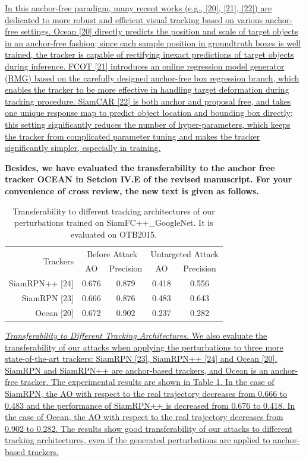 \documentclass[12pt]{article}
\begin{document}
\uline{In this anchor-free paradigm, many recent works (e.g., [20], [21], [22]) are dedicated to more robust and efficient visual tracking based on various anchor-free settings.
Ocean [20] directly predicts the position and scale of target objects in an anchor-free fashion; since each sample position in groundtruth boxes is well trained, the tracker is capable of rectifying inexact predictions of target objects during inference.
FCOT [21] introduces an online regression model generator (RMG) based on the carefully designed anchor-free box regression branch, which enables the tracker to be more effective in handling target deformation during tracking procedure.
SiamCAR [22] is both anchor and proposal free, and takes one unique response map to predict object location and bounding box directly; this setting significantly reduces the number of hyper-parameters, which keeps the tracker from complicated parameter tuning and makes the tracker significantly simpler, especially in training.
}

\textbf{Besides, we have evaluated the transferability to the anchor free tracker OCEAN in Setcion IV.E of the revised manuscript. For your convenience of cross review, the new text is given as follows.}

\begin{table}[t]
  \renewcommand\thetable{XIII}
  \centering
  \caption{Transferability to different tracking architectures of our perturbations trained on SiamFC++\_GoogleNet. It is evaluated on OTB2015.}
  \begin{tabular}{rcccc} 
  \toprule
  \multirow{2}{*}[-2pt]{Trackers} & \multicolumn{2}{c}{Before Attack} & \multicolumn{2}{c}{Untargeted Attack}  \\
  \cmidrule{2-5}
                            & AO & Precision              & AO    & Precision \\ \midrule
  SiamRPN++ [24]            & 0.676   & 0.879             & 0.418 & 0.556     \\
  SiamRPN [23]              & 0.666   & 0.876             & 0.483 & 0.643     \\
  Ocean [20]                & 0.672   & 0.902             & 0.237 & 0.282     \\ \bottomrule
  \end{tabular}
  \label{tab:arch}
\end{table}
\uline{\textit{Transferability to Different Tracking Architectures.} We also evaluate the transferability of our attacks when applying the perturbations to three more state-of-the-art trackers: SiamRPN [23], SiamRPN++ [24] and Ocean [20]. SiamRPN and SiamRPN++ are anchor-based trackers, and Ocean is an anchor-free tracker. The experimental results are shown in Table \ref{tab:arch}. In the case of SiamRPN, the AO with respect to the real trajectory decreases from 0.666 to 0.483 and the performance of SiamRPN++ is decreased from 0.676 to 0.418. In the case of Ocean, the AO with respect to the real trajectory decreases from 0.902 to 0.282. The results show good transferability of our attacks to different tracking architectures, even if the generated perturbations are applied to anchor-based trackers.
}
\end{document}
